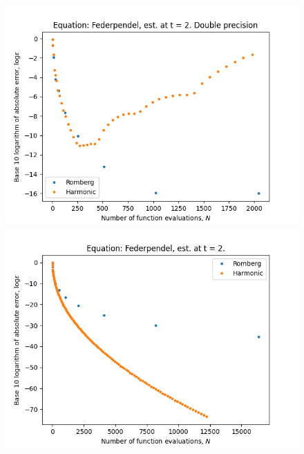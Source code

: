 \begin{figure}[H]
\centering
\begin{minipage}{0.45\textwidth}
\centering
\includegraphics[scale=0.45]{../results/emr_plots/federpendel_2.png}
\end{minipage}
\begin{minipage}{0.45\textwidth}
\centering
\includegraphics[scale=0.45]{../results/emr_plots/federpendel_2_hp.png}
\end{minipage}
\end{figure}

